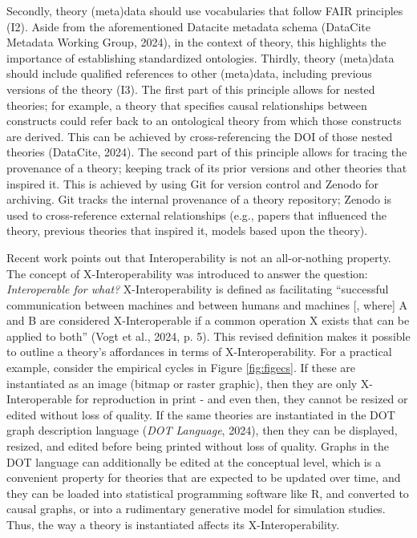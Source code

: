 \documentclass[man]{apa7}
\begin{document}
Secondly, theory (meta)data should use vocabularies that follow FAIR principles (I2).
Aside from the aforementioned Datacite metadata schema (DataCite Metadata Working Group, 2024),
in the context of theory, this highlights the importance of establishing standardized ontologies.
Thirdly, theory (meta)data should include qualified references to other (meta)data, including previous versions of the theory (I3).
The first part of this principle allows for nested theories;
for example, a theory that specifies causal relationships between constructs could refer back to an ontological theory from which those constructs are derived.
This can be achieved by cross-referencing the DOI of those nested theories (DataCite, 2024).
The second part of this principle allows for tracing the provenance of a theory; keeping track of its prior versions and other theories that inspired it.
This is achieved by using Git for version control and Zenodo for archiving.
Git tracks the internal provenance of a theory repository; Zenodo is used to cross-reference external relationships (e.g., papers that influenced the theory, previous theories that inspired it, models based upon the theory).

Recent work points out that Interoperability is not an all-or-nothing property.
The concept of X-Interoperability was introduced to answer the question: \emph{Interoperable for what?}
X-Interoperability is defined as facilitating ``successful communication between machines and between humans and machines {[}, where{]} A and B are considered X-Interoperable if a common operation X exists that can be applied to both'' (Vogt et al., 2024, p. 5).
This revised definition makes it possible to outline a theory's affordances in terms of X-Interoperability.
For a practical example, consider the empirical cycles in Figure \ref{fig:figecs}.
If these are instantiated as an image (bitmap or raster graphic),
then they are only X-Interoperable for reproduction in print - and even then, they cannot be resized or edited without loss of quality.
If the same theories are instantiated in the DOT graph description language (\emph{{DOT Language}}, 2024), then they can be displayed, resized, and edited before being printed without loss of quality.
Graphs in the DOT language can additionally be edited at the conceptual level, which is a convenient property for theories that are expected to be updated over time, and they can be loaded into statistical programming software like R, and converted to causal graphs, or into a rudimentary generative model for simulation studies.
Thus, the way a theory is instantiated affects its X-Interoperability.
\end{document}
